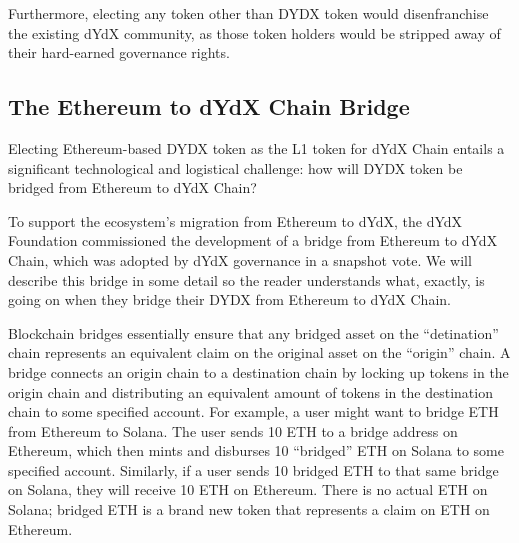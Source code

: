         Furthermore, electing any token other than DYDX token would disenfranchise the existing dYdX community, as those token holders would be stripped away of their hard-earned governance rights. 
        
    \subsection{The Ethereum to dYdX Chain Bridge} \label{subsec:tokentransition}

        Electing Ethereum-based DYDX token as the L1 token for dYdX Chain entails a significant technological and logistical challenge: how will DYDX token be bridged from Ethereum to dYdX Chain? 

        To support the ecosystem's migration from Ethereum to dYdX, the dYdX Foundation commissioned the development of a bridge from Ethereum to dYdX Chain, which was adopted by dYdX governance in a snapshot vote. We will describe this bridge in some detail so the reader understands what, exactly, is going on when they bridge their DYDX from Ethereum to dYdX Chain.

        Blockchain bridges essentially ensure that any bridged asset on the ``detination'' chain represents an equivalent claim on the original asset on the ``origin'' chain. A bridge connects an origin chain to a destination chain by locking up tokens in the origin chain and distributing an equivalent amount of tokens in the destination chain to some specified account. For example, a user might want to bridge ETH from Ethereum to Solana. The user sends 10 ETH to a bridge address on Ethereum, which then mints and disburses 10 ``bridged'' ETH on Solana to some specified account. Similarly, if a user sends 10 bridged ETH to that same bridge on Solana, they will receive 10 ETH on Ethereum. There is no actual ETH on Solana; bridged ETH is a brand new token that represents a claim on ETH on Ethereum.

